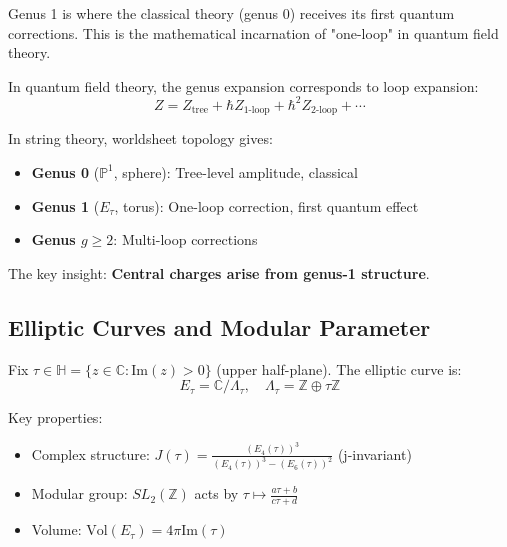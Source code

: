 Genus 1 is where the classical theory (genus 0) receives its first quantum corrections.
This is the mathematical incarnation of "one-loop" in quantum field theory.

\begin{principle}
\label{princ:genus-1-physical}
In quantum field theory, the genus expansion corresponds to loop expansion:
\begin{equation}
Z = Z_{\text{tree}} + \hbar Z_{\text{1-loop}} + \hbar^2 Z_{\text{2-loop}} + \cdots
\end{equation}

In string theory, worldsheet topology gives:
\begin{itemize}
\item \textbf{Genus 0} ($\mathbb{P}^1$, sphere): Tree-level amplitude, classical
\item \textbf{Genus 1} ($E_\tau$, torus): One-loop correction, first quantum effect
\item \textbf{Genus $g \geq 2$}: Multi-loop corrections
\end{itemize}

The key insight: \textbf{Central charges arise from genus-1 structure}.
\end{principle}

\subsection{Elliptic Curves and Modular Parameter}

\begin{definition}
\label{def:elliptic-curve-tau}
Fix $\tau \in \mathbb{H} = \{z \in \mathbb{C} : \text{Im}(z) > 0\}$ (upper half-plane).
The elliptic curve is:
\begin{equation}
E_\tau = \mathbb{C} / \Lambda_\tau, \quad \Lambda_\tau = \mathbb{Z} \oplus \tau\mathbb{Z}
\end{equation}

Key properties:
\begin{itemize}
\item Complex structure: $J(\tau) = \frac{(E_4(\tau))^3}{(E_4(\tau))^3 - (E_6(\tau))^2}$ (j-invariant)
\item Modular group: $SL_2(\mathbb{Z})$ acts by $\tau \mapsto \frac{a\tau + b}{c\tau + d}$
\item Volume: $\text{Vol}(E_\tau) = 4\pi \text{Im}(\tau)$
\end{itemize}
\end{definition}

